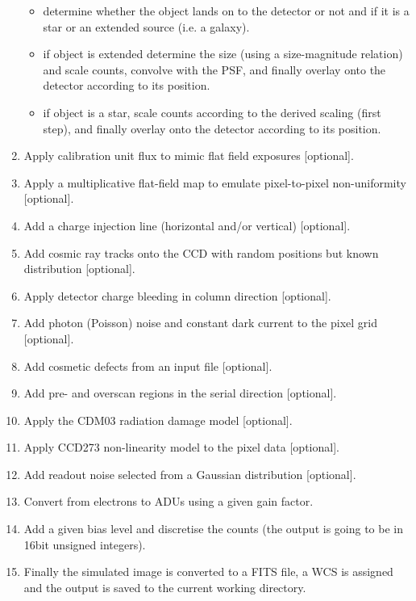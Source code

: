 \documentclass[a4paper,12pt,english]{sphinxmanual}
\begin{document}
\begin{enumerate}
\begin{itemize}
\item {} 
determine whether the object lands on to the detector or not and if it is
a star or an extended source (i.e. a galaxy).

\item {} 
if object is extended determine the size (using a size-magnitude relation) and scale counts,
convolve with the PSF, and finally overlay onto the detector according to its position.

\item {} 
if object is a star, scale counts according to the derived
scaling (first step), and finally overlay onto the detector according to its position.

\end{itemize}

\item {} 
Apply calibration unit flux to mimic flat field exposures {[}optional{]}.

\item {} 
Apply a multiplicative flat-field map to emulate pixel-to-pixel non-uniformity {[}optional{]}.

\item {} 
Add a charge injection line (horizontal and/or vertical) {[}optional{]}.

\item {} 
Add cosmic ray tracks onto the CCD with random positions but known distribution {[}optional{]}.

\item {} 
Apply detector charge bleeding in column direction {[}optional{]}.

\item {} 
Add photon (Poisson) noise and constant dark current to the pixel grid {[}optional{]}.

\item {} 
Add cosmetic defects from an input file {[}optional{]}.

\item {} 
Add pre- and overscan regions in the serial direction {[}optional{]}.

\item {} 
Apply the CDM03 radiation damage model {[}optional{]}.

\item {} 
Apply CCD273 non-linearity model to the pixel data {[}optional{]}.

\item {} 
Add readout noise selected from a Gaussian distribution {[}optional{]}.

\item {} 
Convert from electrons to ADUs using a given gain factor.

\item {} 
Add a given bias level and discretise the counts (the output is going to be in 16bit unsigned integers).

\item {} 
Finally the simulated image is converted to a FITS file, a WCS is assigned
and the output is saved to the current working directory.

\end{enumerate}
\end{document}
